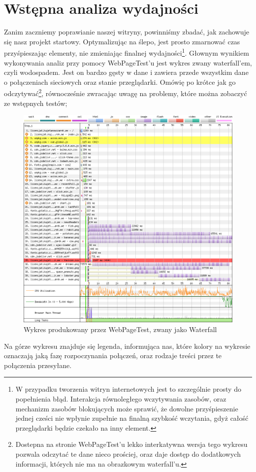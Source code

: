 \documentclass[licencjacka]{pracadypl}
\begin{document}
\chapter{Wstępna analiza wydajności}
Zanim zaczniemy poprawianie naszej witryny, powinniśmy zbadać, jak zachowuje się nasz projekt startowy. Optymalizując na ślepo, jest prosto zmarnować czas przyśpieszając elementy, nie zmieniając finalnej wydajności\footnote{W przypadku tworzenia witryn internetowych jest to szczególnie prosty do popełnienia błąd. Interakcja równoległego wczytywania zasobów, oraz mechanizm zasobów blokujących może sprawić, że dowolne przyśpieszenie jednej cześci nie wpłynie zupełnie na finalną szybkość wczytania, gdyż całość przeglądarki będzie czekało na inny element.}. Głownym wynikiem wykonywania analiz przy pomocy WebPageTest'u jest wykres zwany waterfall'em, czyli wodospadem. Jest on bardzo gęsty w dane i zawiera przede wszystkim dane o połączeniach sieciowych oraz stanie przeglądarki. Omówię po krótce jak go odczytywać\footnote{Dostepna na stronie WebPageTest'u lekko interkatywna wersja tego wykresu pozwala odczytać te dane nieco prościej, oraz daje dostęp do dodatkowych informacji, których nie ma na obrazkowym waterfall'u.}, równocześnie zwracając uwagę na problemy, które można zobaczyć ze wstępnych testów;
\begin{figure}[h!]
  \includegraphics[width=\linewidth]{images/base-waterfall-all-final.png}
  \caption{Wykres produkowany przez WebPageTest, zwany jako Waterfall}
  \label{fig:waterfall-base}
\end{figure}
Na górze wykresu znajduje się legenda, informująca nas, które kolory na wykresie oznaczają jaką fazę rozpoczynania połączeń, oraz rodzaje treści przez te połączenia przesyłane. 
\end{document}
